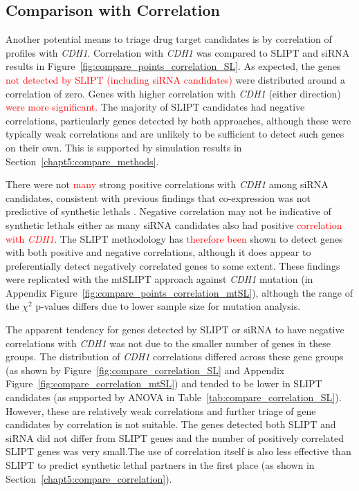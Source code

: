 \subsection{Comparison with Correlation} \label{chapt3:compare_correlation} 

Another potential means to triage drug target candidates is by correlation of  profiles with \textit{CDH1}. Correlation with \textit{CDH1} was compared to \gls{SLIPT} and \gls{siRNA} results in Figure~\ref{fig:compare_points_correlation_SL}. As expected, the genes \textcolor{red}{not detected by \gls{SLIPT} (including \gls{siRNA} candidates)} were distributed around a correlation of zero. Genes with higher correlation with \textit{CDH1} (either direction) \textcolor{red}{were more significant.} The majority of \gls{SLIPT} candidates had negative correlations, particularly genes detected by both approaches, although these were typically weak correlations and are unlikely to be sufficient to detect such genes on their own. This is supported by simulation results in Section~\ref{chapt5:compare_methods}.



There were not \textcolor{red}{many} strong positive correlations with \textit{CDH1} among \gls{siRNA} candidates, consistent with previous findings that co-expression was not predictive of \glspl{synthetic lethal} \citep{Jerby2014, Lu2015}. Negative correlation may not be indicative of \glspl{synthetic lethal} either as many \gls{siRNA} candidates also had positive \textcolor{red}{correlation with \textit{CDH1}}. The \gls{SLIPT} methodology has \textcolor{red}{therefore been} shown to detect genes with both positive and negative correlations, although it does appear to preferentially detect negatively correlated genes to some extent. These findings were replicated with the \acrshort{mtSLIPT} approach against \textit{CDH1} \gls{mutation} (in Appendix Figure~\ref{fig:compare_points_correlation_mtSL}), although the range of the $\chi^2$ p-values differs due to lower sample size for \gls{mutation} analysis.

\FloatBarrier

The apparent tendency for genes detected by \gls{SLIPT} or \gls{siRNA} to have negative correlations with \textit{CDH1}  was not due to the smaller number of genes in these groups. The distribution of \textit{CDH1} correlations differed across these gene groups (as shown by Figure~\ref{fig:compare_correlation_SL} and Appendix Figure~\ref{fig:compare_correlation_mtSL}) and tended to be lower in \gls{SLIPT} candidates (as supported by \gls{ANOVA} in Table~\ref{tab:compare_correlation_SL}). However, these are relatively weak correlations and further triage of gene candidates by correlation is not suitable. The genes detected both \gls{SLIPT} and \gls{siRNA} did not differ from \gls{SLIPT} genes and the number of positively correlated \gls{SLIPT} genes was very small.The use of correlation itself is also less effective than \gls{SLIPT} to predict \gls{synthetic lethal} partners in the first place (as shown in Section~\ref{chapt5:compare_correlation}).

